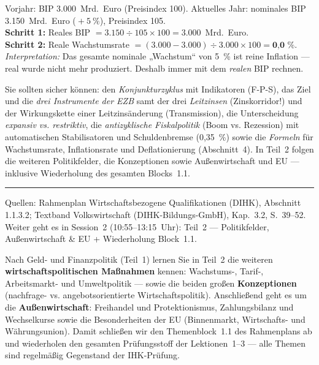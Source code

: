 \documentclass[11pt, a4paper]{article}
\begin{document}
\begin{beispiel}
Vorjahr: BIP 3.000~Mrd.~Euro (Preisindex 100). Aktuelles Jahr: nominales BIP
3.150~Mrd.~Euro (${}+5~\%$), Preisindex 105.\\[0.3em]
\textbf{Schritt 1:} Reales BIP $= 3.150 \div 105 \times 100 = 3.000$~Mrd.~Euro.\\
\textbf{Schritt 2:} Reale Wachstumsrate $= (3.000 - 3.000) \div 3.000 \times 100
= \textbf{0{,}0~\%}$.\\[0.3em]
\emph{Interpretation:} Das gesamte nominale „Wachstum`` von 5~\% ist reine Inflation ---
real wurde nicht mehr produziert. Deshalb immer mit dem \emph{realen} BIP rechnen.
\end{beispiel}

\begin{merksatz}[title={\bfseries Wichtig für die Prüfungsvorbereitung (Teil 1)}]
Sie sollten sicher können: den \emph{Konjunkturzyklus} mit Indikatoren (F-P-S), das Ziel
und die \emph{drei Instrumente der EZB} samt der drei \emph{Leitzinsen} (Zinskorridor!)
und der Wirkungskette einer Leitzinsänderung (Transmission), die Unterscheidung
\emph{expansiv vs. restriktiv}, die \emph{antizyklische Fiskalpolitik} (Boom vs.
Rezession) mit automatischen Stabilisatoren und Schuldenbremse (0,35~\%) sowie die
\emph{Formeln} für Wachstumsrate, Inflationsrate und Deflationierung (Abschnitt~4). In Teil~2
folgen die weiteren Politikfelder, die Konzeptionen sowie Außenwirtschaft und EU ---
inklusive Wiederholung des gesamten Blocks~1.1.
\end{merksatz}

\vspace{1em}
\hrule
\vspace{0.8em}
\noindent\textsf{\small Quellen: Rahmenplan Wirtschaftsbezogene Qualifikationen (DIHK), Abschnitt 1.1.3.2;
Textband Volkswirtschaft (DIHK-Bildungs-GmbH), Kap.~3.2, S.~39--52. Weiter geht es in Session~2 (10:55--13:15~Uhr):
Teil~2 --- Politikfelder, Außenwirtschaft \& EU + Wiederholung Block~1.1.}
\par{}\smallskip
\begin{merksatz}[title={\bfseries Worum geht es in diesem Teil?}]
Nach Geld- und Finanzpolitik (Teil~1) lernen Sie in Teil~2 die weiteren
\textbf{wirtschaftspolitischen Maßnahmen} kennen: Wachstums-, Tarif-, Arbeitsmarkt- und
Umweltpolitik --- sowie die beiden großen \textbf{Konzeptionen} (nachfrage- vs.
angebotsorientierte Wirtschaftspolitik). Anschließend geht es um die
\textbf{Außenwirtschaft}: Freihandel und Protektionismus, Zahlungsbilanz und
Wechselkurse sowie die Besonderheiten der EU (Binnenmarkt, Wirtschafts- und
Währungsunion). Damit schließen wir den Themenblock~1.1
des Rahmenplans ab und wiederholen den gesamten Prüfungsstoff der Lektionen~1--3 ---
alle Themen sind regelmäßig Gegenstand der IHK-Prüfung.
\end{merksatz}
\end{document}
